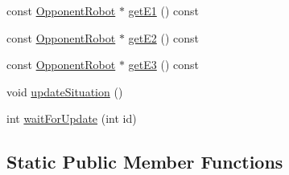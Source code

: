 \begin{DoxyCompactItemize}
const \hyperlink{classOpponentRobot}{OpponentRobot} $\ast$ \hyperlink{classInterpreter_acf9d8aba6db6063eb28e290ae1d4b655}{getE1} () const 
\item 
const \hyperlink{classOpponentRobot}{OpponentRobot} $\ast$ \hyperlink{classInterpreter_a46195d271e54a0e832876364562e4925}{getE2} () const 
\item 
const \hyperlink{classOpponentRobot}{OpponentRobot} $\ast$ \hyperlink{classInterpreter_a71c179ef0fa2c3372733dcae42799da3}{getE3} () const 
\item 
void \hyperlink{classInterpreter_a9b1dfdf67300251fb2c22f37e1d4c646}{updateSituation} ()
\item 
int \hyperlink{classInterpreter_ae09dee3df8e85f0d6b75b6dab5926850}{waitForUpdate} (int id)
\end{DoxyCompactItemize}
\subsection*{Static Public Member Functions}
